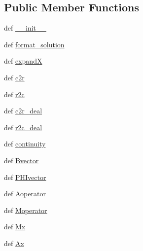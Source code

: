 \subsection*{Public Member Functions}
\begin{DoxyCompactItemize}
\item 
def \hyperlink{classDropbox_1_1ThreeLayerModel_1_1TLM_1_1S2Dmodel_af0c149de9ad666dc556933690201cdeb}{\+\_\+\+\_\+init\+\_\+\+\_\+}
\item 
def \hyperlink{classDropbox_1_1ThreeLayerModel_1_1TLM_1_1S2Dmodel_a5c80320704859ea291892ce1b59302e5}{format\+\_\+solution}
\item 
def \hyperlink{classDropbox_1_1ThreeLayerModel_1_1TLM_1_1S2Dmodel_acad4d54f35253e6f33b626067d9c9bb1}{expand\+X}
\item 
def \hyperlink{classDropbox_1_1ThreeLayerModel_1_1TLM_1_1S2Dmodel_a9d3ce8da25ddff95db720fc32f4b1404}{c2r}
\item 
def \hyperlink{classDropbox_1_1ThreeLayerModel_1_1TLM_1_1S2Dmodel_a2a57f7973f0a589cdfcc9a14abcb0319}{r2c}
\item 
def \hyperlink{classDropbox_1_1ThreeLayerModel_1_1TLM_1_1S2Dmodel_a90111b7f65569d2a4fc1141dfa8b9212}{c2r\+\_\+deal}
\item 
def \hyperlink{classDropbox_1_1ThreeLayerModel_1_1TLM_1_1S2Dmodel_a989422c70341b2cc4f1e15afa7665581}{r2c\+\_\+deal}
\item 
def \hyperlink{classDropbox_1_1ThreeLayerModel_1_1TLM_1_1S2Dmodel_aebc90aa7cea7ff2b819d95065634318f}{continuity}
\item 
def \hyperlink{classDropbox_1_1ThreeLayerModel_1_1TLM_1_1S2Dmodel_a601d94be9810e2d2d891eaa6eeb30625}{Bvector}
\item 
def \hyperlink{classDropbox_1_1ThreeLayerModel_1_1TLM_1_1S2Dmodel_a1e24b1913dc7dbf0993cd1001f0cf501}{P\+H\+Ivector}
\item 
def \hyperlink{classDropbox_1_1ThreeLayerModel_1_1TLM_1_1S2Dmodel_a10ad7bceb8f0469e5d06bdf358bc77ce}{Aoperator}
\item 
def \hyperlink{classDropbox_1_1ThreeLayerModel_1_1TLM_1_1S2Dmodel_a1f7f83044831a19edcdbdf7bdfdf96be}{Moperator}
\item 
def \hyperlink{classDropbox_1_1ThreeLayerModel_1_1TLM_1_1S2Dmodel_af488fccdda5ab412209e2c191d15ed6f}{Mx}
\item 
def \hyperlink{classDropbox_1_1ThreeLayerModel_1_1TLM_1_1S2Dmodel_acaa3e7801ab085aeb60f9baac56f0679}{Ax}
\end{DoxyCompactItemize}
